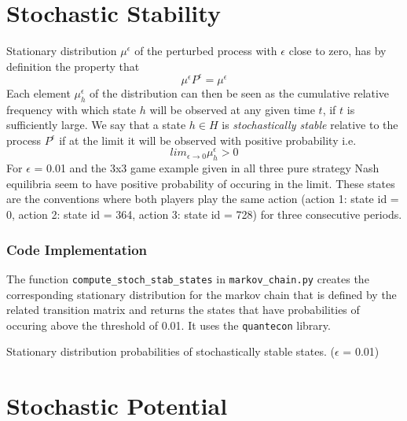 \documentclass[11pt, a4paper, leqno]{article}
\begin{document}
\section{Stochastic Stability} %
\label{subsec:mc_ss}

Stationary distribution $\mu^{\epsilon}$ of the perturbed process with $\epsilon$ close to zero, has by definition the property that
\[\mu^{\epsilon} P^{\epsilon} = \mu^{\epsilon}\]
Each element $\mu_{h}^{\epsilon}$ of the distribution can then be seen as the cumulative relative frequency with which
state $h$ will be observed at any given time $t$, if $t$ is sufficiently large. We say that a state $h \in H$ is \textit{stochastically stable} relative
to the process $P^{\epsilon}$ if at the limit it will be observed with positive probability i.e.
\[ lim_{\epsilon \to 0}\mu_{h}^{\epsilon} > 0 \]
For $\epsilon$ = 0.01 and the 3x3 game example given in  all three pure strategy Nash equilibria
seem to have positive probability of occuring in the limit. These states are the conventions where both players play the same action (action 1: state id = 0,
action 2: state id = 364, action 3: state id = 728) for three consecutive periods.



\subsubsection*{Code Implementation}
The function \texttt{compute\_stoch\_stab\_states} in \texttt{markov\_chain.py} creates the
corresponding stationary distribution for the markov chain that is defined by the related transition
matrix and returns the states that have probabilities of occuring above the threshold of 0.01.
It uses the \texttt{quantecon} library.


\begin{table}
    \begin{center}
    \centering
    
    \caption{\label{tab:python-sd}Stationary distribution probabilities
    of stochastically stable states. ($\epsilon$ = 0.01)}
        \end{center}

\end{table}


\section{Stochastic Potential} %
\label{subsec:mc_sp}
\end{document}
